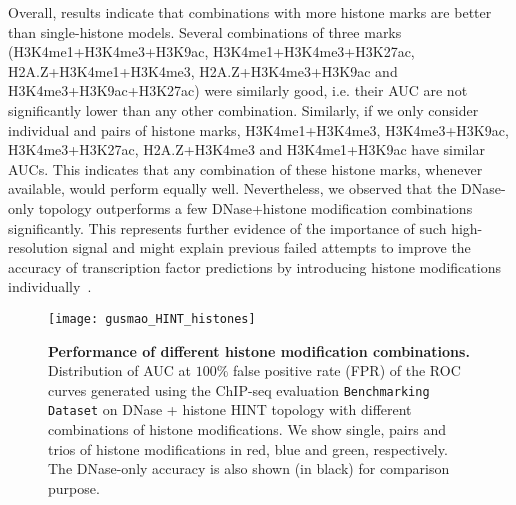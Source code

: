 Overall, results indicate that combinations with more histone marks are better than single-histone models. Several combinations of three marks (H3K4me1+H3K4me3+H3K9ac, H3K4me1+H3K4me3+H3K27ac, H2A.Z+H3K4me1+H3K4me3, H2A.Z+H3K4me3+H3K9ac and H3K4me3+H3K9ac+H3K27ac) were similarly good, i.e. their AUC are not significantly lower than any other combination. Similarly, if we only consider individual and pairs of histone marks, H3K4me1+H3K4me3, H3K4me3+H3K9ac, H3K4me3+H3K27ac, H2A.Z+H3K4me3 and H3K4me1+H3K9ac have similar AUCs. This indicates that any combination of these histone marks, whenever available, would perform equally well. Nevertheless, we observed that the DNase-only topology outperforms a few DNase+histone modification combinations significantly. This represents further evidence of the importance of such high-resolution signal and might explain previous failed attempts to improve the accuracy of transcription factor predictions by introducing histone modifications individually~\cite{pique2011,cuellar2012}.

\begin{figure}[h!]
\centering
\texttt{[image: gusmao\_HINT\_histones]}
\caption[Performance of different histone modification combinations]{\textbf{Performance of different histone modification combinations.} Distribution of AUC at $100\%$ false positive rate (FPR) of the ROC curves generated using the ChIP-seq evaluation {\tt Benchmarking Dataset} on DNase + histone HINT topology with different combinations of histone modifications. We show single, pairs and trios of histone modifications in red, blue and green, respectively. The DNase-only accuracy is also shown (in black) for comparison purpose.}
\label{fig:gusmao_HINT_histones}
\end{figure}

